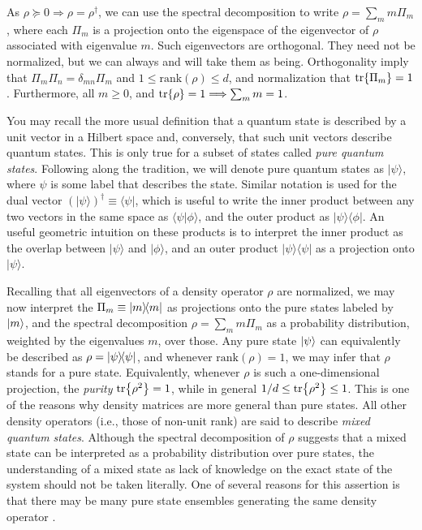 		As $\rho \succeq 0 \Longrightarrow \rho = \rho^\dagger$, we can use the spectral decomposition to write $\rho = \sum_m m \Pi_m$, where each $\Pi_m$ is a projection onto the eigenspace of the eigenvector of $\rho$ associated with eigenvalue $m$. Such eigenvectors are orthogonal. They need not be normalized, but we can always and will take them as being. Orthogonality imply that $\Pi_m \Pi_n = \delta_{mn} \Pi_m$ and $1 \leq \text{rank}(\rho) \leq d$, and normalization that $\tr{\Pi_m} = 1$.  Furthermore, all $m \geq 0$, and $\tr{\rho} = 1 \Longrightarrow \sum_m m = 1$. 
	
		You may recall the more usual definition that a quantum state is described by a unit vector in a Hilbert space and, conversely, that such unit vectors describe quantum states. This is only true for a subset of states called \emph{pure quantum states}. Following along the tradition, we will denote pure quantum states as $\lvert \psi \rangle$, where $\psi$ is some label that describes the state. Similar notation is used for the dual vector $\left( \lvert \psi \rangle \right)^\dagger \equiv \langle \psi \rvert$, which is useful to write the inner product between any two vectors in the same space as $\langle \psi \vert \phi \rangle$, and the outer product as $\lvert \psi \rangle \langle \phi \rvert$. An useful geometric intuition on these products is to interpret the inner product as the overlap between $\vert \psi \rangle$ and $\vert \phi \rangle$, and an outer product $\lvert \psi \rangle \langle \psi \rvert$ as a projection onto $\lvert  \psi \rangle$.
	
		Recalling that all eigenvectors of a density operator $\rho$ are normalized, we may now interpret the $\Pi_m \equiv \ketbra{m}{m}$ as projections onto the pure states labeled by $\ket{m}$, and the spectral decomposition $\rho = \sum_m m \Pi_m$ as a probability distribution, weighted by the eigenvalues $m$, over those. Any pure state $\ket{\psi}$ can equivalently be described as $\rho = \ketbra{\psi}{\psi}$, and whenever $\text{rank}(\rho) = 1$, we may infer that $\rho$ stands for a pure state. Equivalently, whenever $\rho$ is such a one-dimensional projection, the \emph{purity} $\tr{\rho^2} = 1$, while in general $1/d \leq \tr{\rho^2} \leq 1$. This is one of the reasons why density matrices are more general than pure states. All other density operators (i.e., those of non-unit rank) are said to describe \emph{mixed quantum states}. Although the spectral decomposition of $\rho$ suggests that a mixed state can be interpreted as a probability distribution over pure states, the understanding of a mixed state as lack of knowledge on the exact state of the system should not be taken literally. One of several reasons for this assertion is that there may be many pure state ensembles generating the same density operator \cite{hughston_1993_densitymatrix}.
	
